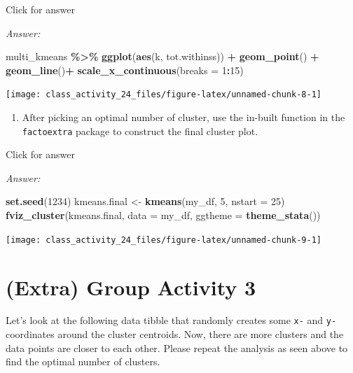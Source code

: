 \documentclass[
]{book}
\newenvironment{Shaded}{\begin{snugshade}}{\end{snugshade}}
\newcommand{\AttributeTok}[1]{\textcolor[rgb]{0.13,0.29,0.53}{#1}}
\newcommand{\DecValTok}[1]{\textcolor[rgb]{0.00,0.00,0.81}{#1}}
\newcommand{\FunctionTok}[1]{\textcolor[rgb]{0.13,0.29,0.53}{\textbf{#1}}}
\newcommand{\NormalTok}[1]{#1}
\newcommand{\OtherTok}[1]{\textcolor[rgb]{0.56,0.35,0.01}{#1}}
\newcommand{\SpecialCharTok}[1]{\textcolor[rgb]{0.81,0.36,0.00}{\textbf{#1}}}
\providecommand{\tightlist}{%
  \setlength{\itemsep}{0pt}\setlength{\parskip}{0pt}}
\begin{document}
Click for answer

\emph{Answer:}

\begin{Shaded}
\begin{Highlighting}[]
\NormalTok{multi\_kmeans }\SpecialCharTok{\%\textgreater{}\%}
  \FunctionTok{ggplot}\NormalTok{(}\FunctionTok{aes}\NormalTok{(k, tot.withinss)) }\SpecialCharTok{+}
  \FunctionTok{geom\_point}\NormalTok{() }\SpecialCharTok{+}
  \FunctionTok{geom\_line}\NormalTok{()}\SpecialCharTok{+}
  \FunctionTok{scale\_x\_continuous}\NormalTok{(}\AttributeTok{breaks =} \DecValTok{1}\SpecialCharTok{:}\DecValTok{15}\NormalTok{) }
\end{Highlighting}
\end{Shaded}

\texttt{[image: class\_activity\_24\_files/figure-latex/unnamed-chunk-8-1]}

\begin{enumerate}
\def\labelenumi{\alph{enumi}.}
\setcounter{enumi}{2}
\tightlist
\item
  After picking an optimal number of cluster, use the in-built function in the \texttt{factoextra} package to construct the final cluster plot.
\end{enumerate}

Click for answer

\emph{Answer:}

\begin{Shaded}
\begin{Highlighting}[]
\FunctionTok{set.seed}\NormalTok{(}\DecValTok{1234}\NormalTok{)}
\NormalTok{kmeans.final }\OtherTok{\textless{}{-}} \FunctionTok{kmeans}\NormalTok{(my\_df, }\DecValTok{5}\NormalTok{, }\AttributeTok{nstart =} \DecValTok{25}\NormalTok{)}
\FunctionTok{fviz\_cluster}\NormalTok{(kmeans.final, }\AttributeTok{data =}\NormalTok{ my\_df, }\AttributeTok{ggtheme =} \FunctionTok{theme\_stata}\NormalTok{())}
\end{Highlighting}
\end{Shaded}

\texttt{[image: class\_activity\_24\_files/figure-latex/unnamed-chunk-9-1]}

\hypertarget{extra-group-activity-3}{%
\section{(Extra) Group Activity 3}\label{extra-group-activity-3}}

Let's look at the following data tibble that randomly creates some \texttt{x-} and \texttt{y-} coordinates around the cluster centroids. Now, there are more clusters and the data points are closer to each other. Please repeat the analysis as seen above to find the optimal number of clusters.
\end{document}
